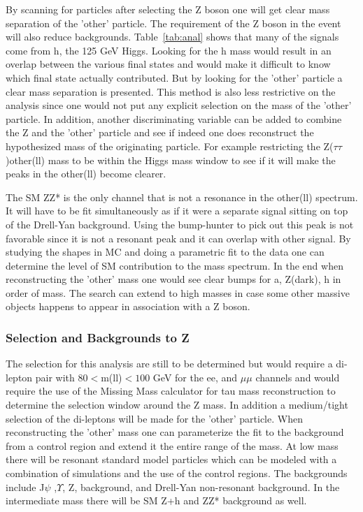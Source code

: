 By scanning for particles after selecting the Z boson one will get clear mass separation of the 'other' particle. The requirement of the Z boson in the event will also reduce backgrounds.  Table~\ref{tab:anal} shows that many of the signals come from h, the 125 GeV Higgs.  Looking for the h mass would result in an overlap between the various final states and  would make it difficult to know which final
state actually contributed.  But by looking for the 'other' particle a clear mass separation is presented.  This method is also less restrictive on the analysis since one would not put any explicit selection on the mass
of the 'other' particle. In addition, another discriminating variable can be added to combine the Z and the 'other' particle and see if indeed one does reconstruct the hypothesized mass of the originating particle.  For example restricting the Z($\tau\tau$)other(ll) mass to be within the Higgs mass window to see if it will make the peaks in the other(ll) become clearer.  

The SM ZZ* is the only channel that is not a resonance in the other(ll) spectrum.  It will have to be fit simultaneously as if it were a separate signal sitting on top of the Drell-Yan background.  Using the
bump-hunter to pick out this peak is not favorable since it is not a resonant peak and it can overlap with other signal.  By studying the shapes in MC and doing a parametric fit to the data one can determine the level of SM contribution to the mass spectrum.
In the end when reconstructing the 'other' mass one would see clear bumps for a, Z(dark), h in order of mass. The search can extend to high masses in case some other massive objects happens to appear in association with a Z boson.  


\subsubsection{Selection and Backgrounds to Z }
\label{sec:zscanback}
The selection for this analysis are still to be determined but would require a di-lepton pair with $80<$m(ll)$<100$ GeV for the ee, and $\mu\mu$ channels and would require the use of the Missing Mass calculator for tau mass
reconstruction to determine the selection window around the Z mass.  In addition a medium/tight selection of the di-leptons will be made for the 'other' particle. 
When reconstructing the 'other' mass one can parameterize the fit to the background from a control region and extend it the entire range of the mass.  At low mass there will be resonant standard model particles which can be modeled with a combination of simulations and the use of the control regions.
The backgrounds include J$\psi$ ,$\Upsilon$, Z, \ttbar background, and Drell-Yan non-resonant background. In the intermediate mass there will be SM Z+h and ZZ* background as well.


